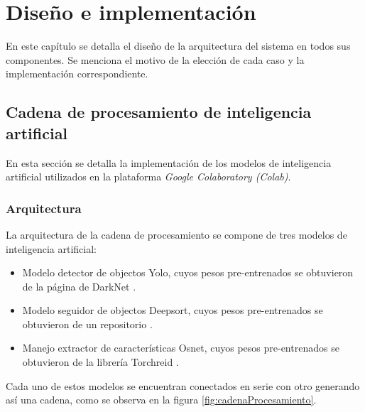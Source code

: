 \chapter{Diseño e implementación} %

\label{Chapter3} %

En este capítulo se detalla el diseño de la arquitectura del sistema en todos sus componentes. Se menciona el motivo de la elección de cada caso y la implementación correspondiente.


\section{Cadena de procesamiento de inteligencia artificial}
\label{sec:cadenaProcesamiento}

En esta sección se detalla la implementación de los modelos de inteligencia artificial utilizados en la plataforma \textit{Google Colaboratory (Colab)}.

\subsection{Arquitectura}

La arquitectura de la cadena de procesamiento se compone de tres modelos de inteligencia artificial:

\begin{itemize}
\item Modelo detector de objectos Yolo, cuyos pesos pre-entrenados se obtuvieron de la página de DarkNet \citep{YOLO_MODELO}.
\item Modelo seguidor de objectos Deepsort, cuyos pesos pre-entrenados se obtuvieron de un repositorio \citep{DEEPSORT_MODELO}.
\item Manejo extractor de características Osnet, cuyos pesos pre-entrenados se obtuvieron de la librería Torchreid \citep{OSNET_MODELO}.
\end{itemize}

Cada uno de estos modelos se encuentran conectados en serie con otro generando así una cadena, como se observa en la figura \ref{fig:cadenaProcesamiento}.

